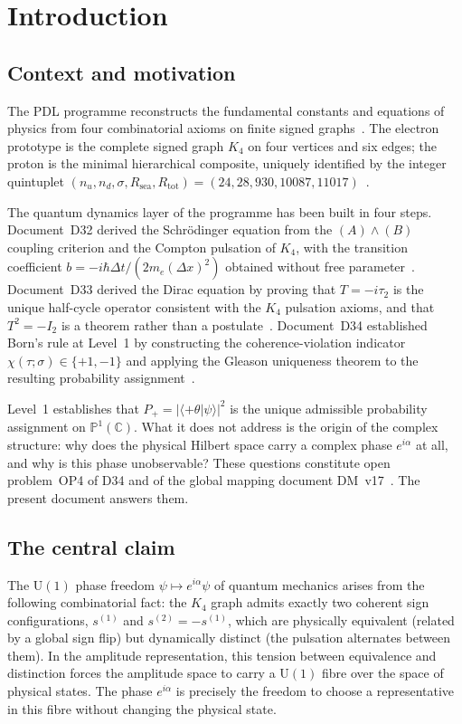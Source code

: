 \documentclass[12pt,a4paper]{article}
\newcommand{\hb}{\hbar}
\newcommand{\CC}{\mathbb{C}}
\newcommand{\PP}{\mathbb{P}}
\begin{document}
\section{Introduction}
\label{sec:intro}

\subsection{Context and motivation}

The PDL programme reconstructs the fundamental constants and equations of physics from
four combinatorial axioms on finite signed graphs~\cite{PDL_Main_2026}. The electron
prototype is the complete signed graph $K_4$ on four vertices and six edges; the proton
is the minimal hierarchical composite, uniquely identified by the integer quintuplet
$(n_u, n_d, \sigma, R_{\mathrm{sea}}, R_{\mathrm{tot}}) = (24, 28, 930, 10087, 11017)$~\cite{D16_PDL_2026}.

The quantum dynamics layer of the programme has been built in four steps. Document~D32
derived the Schrödinger equation from the $(A)\wedge(B)$ coupling criterion and the
Compton pulsation of $K_4$, with the transition coefficient
$b = -i\hb\Delta t / (2m_e(\Delta x)^2)$ obtained without free parameter~\cite{PDL_D32_2026}.
Document~D33 derived the Dirac equation by proving that $T = -i\tau_2$ is the unique
half-cycle operator consistent with the $K_4$ pulsation axioms, and that $T^2 = -I_2$
is a theorem rather than a postulate~\cite{PDL_D33_2026}. Document~D34 established
Born's rule at Level~1 by constructing the coherence-violation indicator
$\chi(\tau;\sigma) \in \{+1,-1\}$ and applying the Gleason uniqueness theorem to the
resulting probability assignment~\cite{PDL_D34_2026}.

Level~1 establishes that $P_+ = |\langle+\theta|\psi\rangle|^2$ is the unique
admissible probability assignment on $\PP^1(\CC)$. What it does not address is the
origin of the complex structure: why does the physical Hilbert space carry a complex
phase $e^{i\alpha}$ at all, and why is this phase unobservable? These questions
constitute open problem~OP4 of D34 and of the global mapping document
DM~v17~\cite{PDL_DM_v17_2026}. The present document answers them.

\subsection{The central claim}

The $\mathrm{U}(1)$ phase freedom $\psi \mapsto e^{i\alpha}\psi$ of quantum mechanics
arises from the following combinatorial fact: the $K_4$ graph admits exactly two coherent
sign configurations, $s^{(1)}$ and $s^{(2)} = -s^{(1)}$, which are physically
equivalent (related by a global sign flip) but dynamically distinct (the pulsation
alternates between them). In the amplitude representation, this tension between
equivalence and distinction forces the amplitude space to carry a $\mathrm{U}(1)$
fibre over the space of physical states. The phase $e^{i\alpha}$ is precisely the
freedom to choose a representative in this fibre without changing the physical state.
\end{document}
